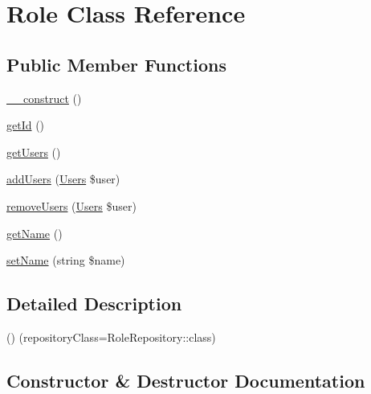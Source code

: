\hypertarget{class_app_1_1_entity_1_1_role}{}\section{Role Class Reference}
\label{class_app_1_1_entity_1_1_role}
\subsection*{Public Member Functions}
\begin{DoxyCompactItemize}
\item 
\mbox{\hyperlink{class_app_1_1_entity_1_1_role_a095c5d389db211932136b53f25f39685}{\+\_\+\+\_\+construct}} ()
\item 
\mbox{\hyperlink{class_app_1_1_entity_1_1_role_a12251d0c022e9e21c137a105ff683f13}{get\+Id}} ()
\item 
\mbox{\hyperlink{class_app_1_1_entity_1_1_role_a0fc10b64683021b70c7eb95fb514c119}{get\+Users}} ()
\item 
\mbox{\hyperlink{class_app_1_1_entity_1_1_role_a79440b2b582b2ea5990f400faf2c8293}{add\+Users}} (\mbox{\hyperlink{class_app_1_1_entity_1_1_users}{Users}} \$user)
\item 
\mbox{\hyperlink{class_app_1_1_entity_1_1_role_a1432bc398227897369e3cc1874a2ec17}{remove\+Users}} (\mbox{\hyperlink{class_app_1_1_entity_1_1_users}{Users}} \$user)
\item 
\mbox{\hyperlink{class_app_1_1_entity_1_1_role_a3d0963e68bb313b163a73f2803c64600}{get\+Name}} ()
\item 
\mbox{\hyperlink{class_app_1_1_entity_1_1_role_a392752b62c4f6aacea5c269690921ef3}{set\+Name}} (string \$name)
\end{DoxyCompactItemize}


\subsection{Detailed Description}
() (repository\+Class=Role\+Repository\+::class) 

\subsection{Constructor \& Destructor Documentation}
\mbox{\label{class_app_1_1_entity_1_1_role_a095c5d389db211932136b53f25f39685}} 
